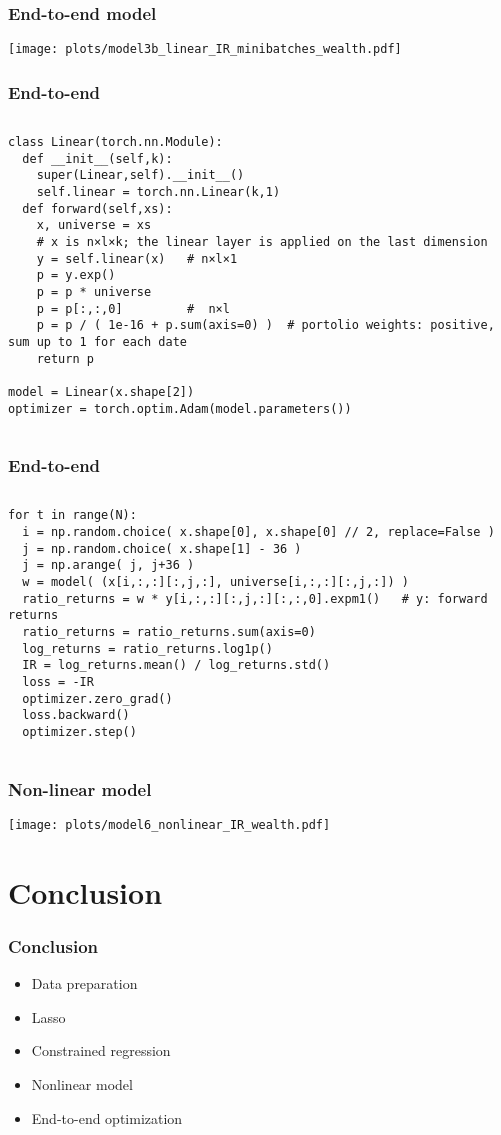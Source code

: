 \documentclass[a4paper,12pt,compress,serif]{beamer}
\begin{document}
\begin{frame}
  \frametitle{End-to-end model}
  \texttt{[image: plots/model3b\_linear\_IR\_minibatches\_wealth.pdf]}
\end{frame}

\begin{frame}[fragile]
  \frametitle{End-to-end}
  \begin{columns}
    \column{\dimexpr\paperwidth-10pt}
\begin{verbatim}
class Linear(torch.nn.Module):
  def __init__(self,k):
    super(Linear,self).__init__()
    self.linear = torch.nn.Linear(k,1)
  def forward(self,xs):
    x, universe = xs
    # x is n×l×k; the linear layer is applied on the last dimension
    y = self.linear(x)   # n×l×1
    p = y.exp()      
    p = p * universe
    p = p[:,:,0]         #  n×l
    p = p / ( 1e-16 + p.sum(axis=0) )  # portolio weights: positive, sum up to 1 for each date
    return p
    
model = Linear(x.shape[2])
optimizer = torch.optim.Adam(model.parameters())
\end{verbatim}
  \end{columns}
\end{frame}

\begin{frame}[fragile]
  \frametitle{End-to-end}
  \begin{columns}
    \column{\dimexpr\paperwidth-10pt}
\begin{verbatim}
for t in range(N):
  i = np.random.choice( x.shape[0], x.shape[0] // 2, replace=False ) 
  j = np.random.choice( x.shape[1] - 36 )
  j = np.arange( j, j+36 )    
  w = model( (x[i,:,:][:,j,:], universe[i,:,:][:,j,:]) )
  ratio_returns = w * y[i,:,:][:,j,:][:,:,0].expm1()   # y: forward returns
  ratio_returns = ratio_returns.sum(axis=0)
  log_returns = ratio_returns.log1p()
  IR = log_returns.mean() / log_returns.std()
  loss = -IR
  optimizer.zero_grad()
  loss.backward()
  optimizer.step()
\end{verbatim}
  \end{columns}
\end{frame}

\begin{frame}
  \frametitle{Non-linear model}
  \texttt{[image: plots/model6\_nonlinear\_IR\_wealth.pdf]}
\end{frame}

\section{Conclusion}
\frame{\tableofcontents[currentsection]}
\begin{frame}
  \frametitle{Conclusion}
  \begin{itemize}
  \item Data preparation
  \item Lasso
  \item Constrained regression
  \item Nonlinear model
  \item End-to-end optimization
  \end{itemize}    
\end{frame}
\end{document}
